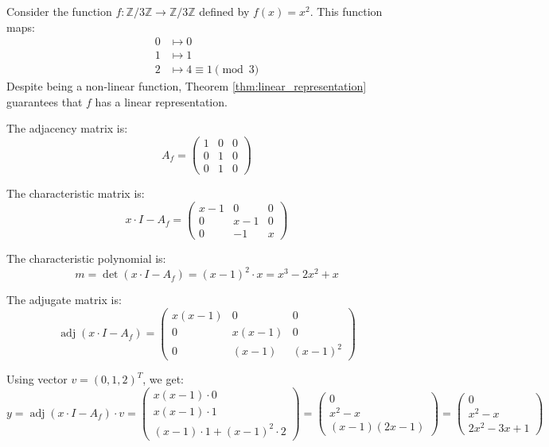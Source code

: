 \begin{example}
\label{ex:quadratic_Z3}
Consider the function $f: \mathbb{Z}/3\mathbb{Z} \to \mathbb{Z}/3\mathbb{Z}$ defined by $f(x) = x^2$.
This function maps:
\begin{align*}
0 &\mapsto 0 \\
1 &\mapsto 1 \\
2 &\mapsto 4 \equiv 1 \pmod{3}
\end{align*}
Despite being a non-linear function, Theorem \ref{thm:linear_representation} guarantees that $f$ has a linear representation.

The adjacency matrix is:
$$A_f = \begin{pmatrix}
1 & 0 & 0 \\
0 & 1 & 0 \\
0 & 1 & 0
\end{pmatrix}$$

The characteristic matrix is:
$$x \cdot I - A_f = \begin{pmatrix}
x-1 & 0 & 0 \\
0 & x-1 & 0 \\
0 & -1 & x
\end{pmatrix}$$

The characteristic polynomial is:
$$m = \det(x \cdot I - A_f) = (x-1)^2 \cdot x = x^3 - 2x^2 + x$$

The adjugate matrix is:
$$\operatorname{adj}(x \cdot I - A_f) = \begin{pmatrix}
x(x-1) & 0 & 0 \\
0 & x(x-1) & 0 \\
0 & (x-1) & (x-1)^2
\end{pmatrix}$$

Using vector $v = (0, 1, 2)^T$, we get:
$$y = \operatorname{adj}(x \cdot I - A_f) \cdot v = \begin{pmatrix}
x(x-1) \cdot 0 \\
x(x-1) \cdot 1 \\
(x-1) \cdot 1 + (x-1)^2 \cdot 2
\end{pmatrix} = \begin{pmatrix}
0 \\
x^2 - x \\
(x-1)(2x-1)
\end{pmatrix} = \begin{pmatrix}
0 \\
x^2 - x \\
2x^2 - 3x + 1
\end{pmatrix}$$


\end{example}
